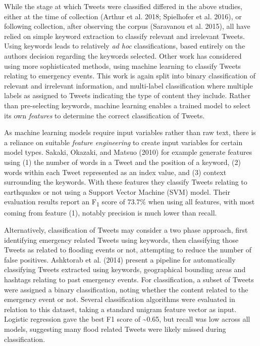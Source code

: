 \documentclass[a4paper, notitlepage]{extreport}
\begin{document}
While the stage at which Tweets were classified differed in the above
studies, either at the time of collection (Arthur et al. 2018;
Spielhofer et al. 2016), or following collection, after observing the
corpus (Saravanou et al. 2015), all have relied on simple keyword
extraction to classify relevant and irrelevant Tweets. Using keywords
leads to relatively \emph{ad hoc} classifications, based entirely on the
authors decision regarding the keywords selected. Other work has
considered using more sophisticated methods, using machine learning to
classify Tweets relating to emergency events. This work is again split
into binary classification of relevant and irrelevant information, and
multi-label classification where multiple labels as assigned to Tweets
indicating the type of content they include. Rather than pre-selecting
keywords, machine learning enables a trained model to select its own
\emph{features} to determine the correct classification of Tweets.

As machine learning models require input variables rather than raw text,
there is a reliance on suitable \emph{feature engineering} to create
input variables for certain model types. Sakaki, Okazaki, and Matsuo
(2010) for example generate features using (1) the number of words in a
Tweet and the position of a keyword, (2) words within each Tweet
represented as an index value, and (3) context surrounding the keywords.
With these features they classify Tweets relating to earthquakes or not
using a Support Vector Machine (SVM) model. Their evaluation results
report an F\textsubscript{1} score of 73.7\% when using all features,
with most coming from feature (1), notably precision is much lower than
recall.

Alternatively, classification of Tweets may consider a two phase
approach, first identifying emergency related Tweets using keywords,
then classifying those Tweets as related to flooding events or not,
attempting to reduce the number of false positives. Ashktorab et al.
(2014) present a pipeline for automatically classifying Tweets extracted
using keywords, geographical bounding areas and hashtags relating to
past emergency events. For classification, a subset of Tweets were
assigned a binary classification, noting whether the content related to
the emergency event or not. Several classification algorithms were
evaluated in relation to this dataset, taking a standard unigram feature
vector as input. Logistic regression gave the best F1 score of
\textasciitilde0.65, but recall was low across all models, suggesting
many flood related Tweets were likely missed during classification.
\end{document}

